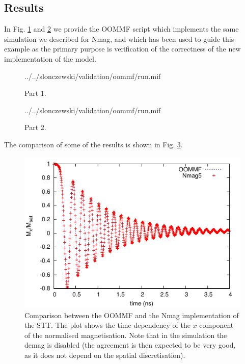 \documentclass[11pt,oneside,openany]{article}
\begin{document}
%
%
%

\subsection{Results}
In Fig. \ref{fig:mif1of2} and \ref{fig:mif2of2} we provide the OOMMF
script which implements the same simulation we described for Nmag, and
which has been used to guide this example as the primary purpose is
verification of the correctness of the new implementation of the model.

\begin{figure}[!p]
  {../../slonczewski/validation/oommf/run.mif}
\caption{Part 1.}
\label{fig:mif1of2}
\end{figure}

\begin{figure}[!h]
  {../../slonczewski/validation/oommf/run.mif}
\caption{Part 2.}
\label{fig:mif2of2}
\end{figure}

The comparison of some of the results is shown in Fig. \ref{fig:results}.

\begin{figure}[!h]
\includegraphics[width=1\textwidth]{plot}
\caption{Comparison between the OOMMF and the Nmag implementation of the STT.
  The plot shows the time dependency of the $x$ component of the normalised
  magnetisation. Note that in the simulation the demag is disabled (the
  agreement is then expected to be very good, as it does not depend
  on the spatial discretisation).}
\label{fig:results}
\end{figure}
\end{document}
